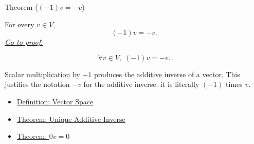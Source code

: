 \begin{theorembox}{Theorem ($(-1)v=-v$)}
\begin{theorem}[$(-1)v=-v$]
\label{thm:minus-one-times-vector}
For every $v \in V$,
\[
(-1)v=-v.
\]
\hyperref[prf:minus-one-times-vector]{\textit{Go to proof.}}
\end{theorem}
\end{theorembox}

\begin{remark*}
\[
\forall v \in V,\; (-1)v=-v.
\]
\end{remark*}

\begin{remark*}[Interpretation]
Scalar multiplication by $-1$ produces the additive inverse of a vector.
This justifies the notation $-v$ for the additive inverse: it is literally
$(-1)$ times $v$.
\end{remark*}

\begin{dependencies}
\begin{itemize}
  \item \hyperref[def:vector-space]{Definition: Vector Space}
  \item \hyperref[thm:unique-additive-inverse]{Theorem: Unique Additive Inverse}
  \item \hyperref[thm:zero-scalar-times-vector]{Theorem: $0v=0$}
\end{itemize}
\end{dependencies}
